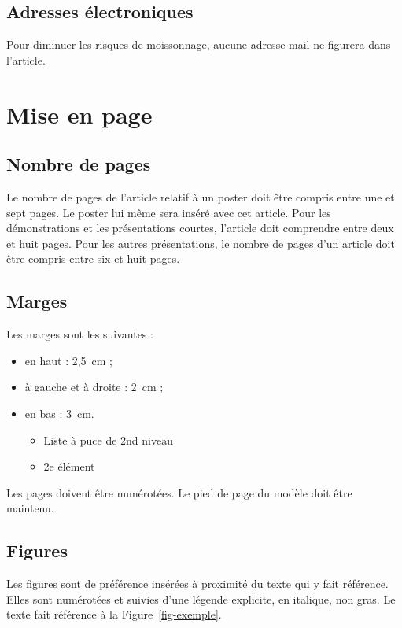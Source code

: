 \documentclass{jres}
\begin{document}
\subsection{Adresses électroniques}

Pour diminuer les risques de moissonnage, aucune adresse mail ne
figurera dans l'article.

\section{Mise en page}

\subsection{Nombre de pages}

Le nombre de pages de l'article relatif à un poster doit être compris
entre une et sept pages. Le poster lui même sera inséré avec cet
article. Pour les démonstrations et les présentations courtes,
l'article doit comprendre entre deux et huit pages. Pour les autres
présentations, le nombre de pages d'un article doit être compris entre
six et huit pages.

\subsection{Marges}

Les marges sont les suivantes :

\begin{itemize}
\item en haut : 2,5\ cm ;
\item à gauche et à droite : 2\ cm ;
\item en bas : 3\ cm.
\begin{itemize}
\item Liste à puce de 2nd niveau
\item 2e élément
\end{itemize}
\end{itemize}

Les pages doivent être numérotées. Le pied de page du modèle doit être
maintenu.

\subsection{Figures}

Les figures sont de préférence insérées à proximité du texte qui y
fait référence. Elles sont numérotées et suivies d'une légende
explicite, en italique, non gras. Le texte fait référence à la 
Figure~\ref{fig-exemple}.
\end{document}
